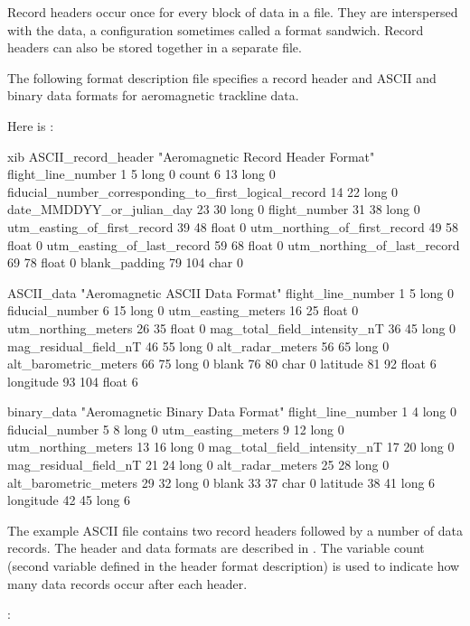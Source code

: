 Record headers occur once for every block of data in a file. They are
interspersed with the data, a configuration sometimes called a format
sandwich. Record headers can also be stored together in a separate
file.

The following format description file specifies a record header and
ASCII and binary data formats for aeromagnetic trackline data.

Here is :

\begin{vcode}{xib}
ASCII_record_header "Aeromagnetic Record Header Format"
flight_line_number 1 5 long 0
count 6 13 long 0
fiducial_number_corresponding_to_first_logical_record 14 22 long 0
date_MMDDYY_or_julian_day 23 30 long 0
flight_number 31 38 long 0
utm_easting_of_first_record 39 48 float 0
utm_northing_of_first_record 49 58 float 0
utm_easting_of_last_record 59 68 float 0
utm_northing_of_last_record 69 78 float 0
blank_padding 79 104 char 0

ASCII_data "Aeromagnetic ASCII Data Format"
flight_line_number 1 5 long 0
fiducial_number 6 15 long 0
utm_easting_meters 16 25 float 0
utm_northing_meters 26 35 float 0
mag_total_field_intensity_nT 36 45 long 0
mag_residual_field_nT 46 55 long 0
alt_radar_meters 56 65 long 0
alt_barometric_meters 66 75 long 0
blank 76 80 char 0
latitude 81 92 float 6
longitude 93 104 float 6

binary_data "Aeromagnetic Binary Data Format"
flight_line_number 1 4 long 0
fiducial_number 5 8 long 0
utm_easting_meters 9 12 long 0
utm_northing_meters 13 16 long 0
mag_total_field_intensity_nT 17 20 long 0
mag_residual_field_nT 21 24 long 0
alt_radar_meters 25 28 long 0
alt_barometric_meters 29 32 long 0
blank 33 37 char 0
latitude 38 41 long 6
longitude 42 45 long 6 
\end{vcode}

The example ASCII file  contains two record headers
followed by a number of data records. The header and data formats are
described in . The variable count (second variable
defined in the header format description) is used to indicate how many
data records occur after each header.

: 

